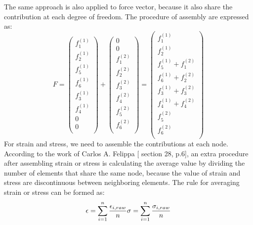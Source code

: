 The same approach is also applied to force vector, because it also share the contribution at each degree of freedom. The procedure of assembly are expressed as:
\begin{equation}
F =  \begin{pmatrix}
f_1^{\left(1\right)} \\
f_2^{\left(1\right)} \\
f_5^{\left(1\right)} \\ 
f_6^{\left(1\right)} \\ 
f_3^{\left(1\right)} \\
f_4^{\left(1\right)} \\
0 \\ 
0 \\ 
\end{pmatrix} +  \begin{pmatrix}
0 \\ 
0 \\ 
f_1^{\left(2\right)} \\
f_2^{\left(2\right)} \\
f_3^{\left(2\right)} \\ 
f_4^{\left(2\right)} \\ 
f_5^{\left(2\right)} \\
f_6^{\left(2\right)} \\
\end{pmatrix} = \begin{pmatrix}
f_1^{\left(1\right)} \\
f_2^{\left(1\right)} \\
f_5^{\left(1\right)}+ f_1^{\left(2\right)} \\ 
f_6^{\left(1\right)}+ f_2^{\left(2\right)} \\ 
f_3^{\left(1\right)}+ f_3^{\left(2\right)}\\
f_4^{\left(1\right)}+ f_4^{\left(2\right)} \\
f_5^{\left(2\right)} \\ 
f_6^{\left(2\right)}  \\ 
\end{pmatrix} 
\end{equation}
For strain and stress, we need to assemble the contributions at each node. According to the work of Carlos A. Felippa [\cite{Felippa} section 28, p.6], an extra procedure after assembling strain or stress is calculating the average value by dividing the number of elements that share the same node, because the value of strain and stress are discontinuous between neighboring elements. The rule for averaging strain or stress can be formed as:
\begin{equation}
\epsilon = \displaystyle\sum_{i=1}^{n} \frac{\epsilon_{i,raw}}{n}
\\
\sigma = \displaystyle\sum_{i=1}^{n} \frac{\sigma_{i,raw}}{n}
\end{equation} 



